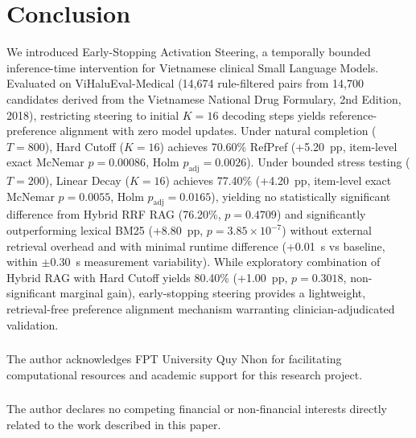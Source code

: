 \documentclass[runningheads]{llncs}
\begin{document}
\section{Conclusion}\label{sec:conclusion}
We introduced Early-Stopping Activation Steering, a temporally bounded inference-time intervention for Vietnamese clinical Small Language Models. Evaluated on ViHaluEval-Medical (14,674 rule-filtered pairs from 14,700 candidates derived from the Vietnamese National Drug Formulary, 2nd Edition, 2018), restricting steering to initial $K=16$ decoding steps yields reference-preference alignment with zero model updates. Under natural completion ($T=800$), Hard Cutoff ($K=16$) achieves 70.60\% RefPref (+5.20~pp, item-level exact McNemar $p=0.00086$, Holm $p_{\text{adj}}=0.0026$). Under bounded stress testing ($T=200$), Linear Decay ($K=16$) achieves 77.40\% (+4.20~pp, item-level exact McNemar $p=0.0055$, Holm $p_{\text{adj}}=0.0165$), yielding no statistically significant difference from Hybrid RRF RAG (76.20\%, $p=0.4709$) and significantly outperforming lexical BM25 (+8.80~pp, $p=3.85 \times 10^{-7}$) without external retrieval overhead and with minimal runtime difference (+0.01~s vs baseline, within $\pm 0.30$~s measurement variability). While exploratory combination of Hybrid RAG with Hard Cutoff yields 80.40\% (+1.00~pp, $p=0.3018$, non-significant marginal gain), early-stopping steering provides a lightweight, retrieval-free preference alignment mechanism warranting clinician-adjudicated validation.

\begin{credits}
\subsubsection{\ackname} The author acknowledges FPT University Quy Nhon for facilitating computational resources and academic support for this research project.

\subsubsection{\discintname} The author declares no competing financial or non-financial interests directly related to the work described in this paper.
\end{credits}
\end{document}
